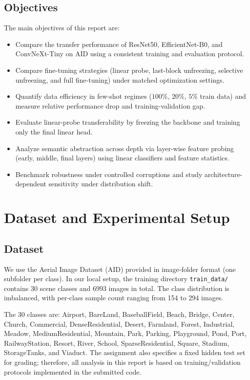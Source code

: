 \documentclass[11pt,a4paper]{article}
\begin{document}
\subsection{Objectives}
The main objectives of this report are:
\begin{itemize}
	\item Compare the transfer performance of ResNet50, EfficientNet-B0, and ConvNeXt-Tiny on AID using a consistent training and evaluation protocol.
	\item Compare fine-tuning strategies (linear probe, last-block unfreezing, selective unfreezing, and full fine-tuning) under matched optimization settings.
	\item Quantify data efficiency in few-shot regimes ($100\%$, $20\%$, $5\%$ train data) and measure relative performance drop and training-validation gap.
	\item Evaluate linear-probe transferability by freezing the backbone and training only the final linear head.
	\item Analyze semantic abstraction across depth via layer-wise feature probing (early, middle, final layers) using linear classifiers and feature statistics.
	\item Benchmark robustness under controlled corruptions and study architecture-dependent sensitivity under distribution shift.
\end{itemize}

\section{Dataset and Experimental Setup}
\subsection{Dataset}
We use the Aerial Image Dataset (AID) provided in image-folder format (one subfolder per class). In our local setup, the training directory \texttt{train\_data/} contains 30 scene classes and 6993 images in total. The class distribution is imbalanced, with per-class sample count ranging from 154 to 294 images.

The 30 classes are: Airport, BareLand, BaseballField, Beach, Bridge, Center, Church, Commercial, DenseResidential, Desert, Farmland, Forest, Industrial, Meadow, MediumResidential, Mountain, Park, Parking, Playground, Pond, Port, RailwayStation, Resort, River, School, SparseResidential, Square, Stadium, StorageTanks, and Viaduct. The assignment also specifies a fixed hidden test set for grading; therefore, all analysis in this report is based on training/validation protocols implemented in the submitted code.
\end{document}
